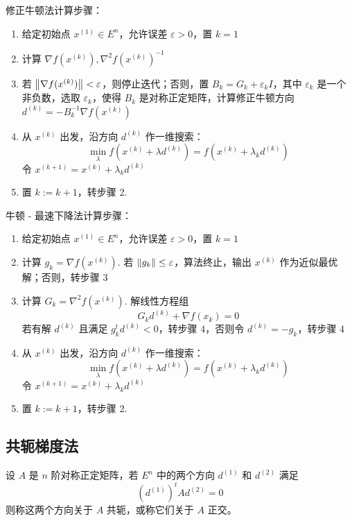 \begin{note}
    修正牛顿法计算步骤：\begin{enumerate}
        \item 给定初始点 $x^{(1)} \in E^n$，允许误差 $\varepsilon > 0$，置 $k = 1$
        \item 计算 $\nabla f(x^{(k)}), \nabla^2f(x^{(k)})^{-1}$
        \item 若 $\norm{\nabla f(x^{(k)})} < \varepsilon$，则停止迭代；否则，置 $B_k = G_k + \varepsilon_k I$，其中 $\varepsilon_k$ 是一个非负数，选取 $\varepsilon_k$，使得 $B_k$ 是对称正定矩阵，计算修正牛顿方向 $d^{(k)} = -B_k^{-1}\nabla f(x^{(k)})$
        \item 从 $x^{(k)}$ 出发，沿方向 $d^{(k)}$ 作一维搜索：\[\min_{\lambda} f(x^{(k)} + \lambda d^{(k)}) = f(x^{(k)} + \lambda_k d^{(k)})\] 令 $x^{(k + 1)} = x^{(k)} + \lambda_k d^{(k)}$
        \item 置 $k := k + 1$，转步骤 2.
    \end{enumerate}
\end{note}

\begin{note}
    牛顿 - 最速下降法计算步骤：\begin{enumerate}
        \item 给定初始点 $x^{(1)} \in E^n$，允许误差 $\varepsilon > 0$，置 $k = 1$
        \item 计算 $g_k = \nabla f(x^{(k)})$. 若 $\norm{g_k} \le \varepsilon$，算法终止，输出 $x^{(k)}$ 作为近似最优解；否则，转步骤 3
        \item 计算 $G_k = \nabla^2f(x^{(k)})$. 解线性方程组\[G_kd^{(k)} + \nabla f(x_k) = 0\] 若有解 $d^{(k)}$ 且满足 $g_k^td^{(k)} < 0$，转步骤 4，否则令 $d^{(k)} = -g_k$，转步骤 4
        \item 从 $x^{(k)}$ 出发，沿方向 $d^{(k)}$ 作一维搜索：\[\min_{\lambda} f(x^{(k)} + \lambda d^{(k)}) = f(x^{(k)} + \lambda_k d^{(k)})\] 令 $x^{(k + 1)} = x^{(k)} + \lambda_k d^{(k)}$
        \item 置 $k := k + 1$，转步骤 2.
    \end{enumerate}
\end{note}

\subsection{共轭梯度法}
\begin{definition}[2-共轭方向]
    设 $A$ 是 $n$ 阶对称正定矩阵，若 $E^n$ 中的两个方向 $d^{(1)}$ 和 $d^{(2)}$ 满足 
    \[
        \left(d^{(1)}\right)^tAd^{(2)} = 0
    \]
    则称这两个方向关于 $A$ 共轭，或称它们关于 $A$ 正交。
\end{definition}


